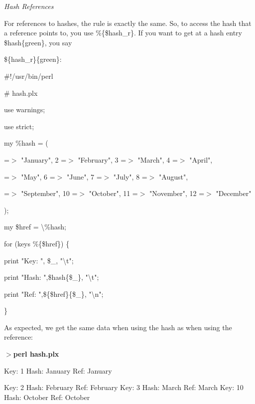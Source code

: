 \documentclass[a4paper,11pt]{book}
\begin{document}
\noindent \textit{Hash References}

\noindent For references to hashes, the rule is exactly the same. So, to access the hash that a reference points to, you use \%\{\$hash\_r\}. If you want to get at a hash entry \$hash\{green\}, you say

\noindent \$\{hash\_r\}\{green\}:

\noindent 

\noindent \#!/usr/bin/perl

\noindent \# hash.plx

\noindent use warnings;

\noindent use strict;

\noindent 

\noindent my \%hash = (

 =$>$ "January", 2 =$>$ "February", 3 =$>$ "March", 4 =$>$ "April",

 =$>$ "May", 6 =$>$ "June", 7 =$>$ "July", 8 =$>$ "August",

 =$>$ "September", 10 =$>$ "October", 11 =$>$ "November", 12 =$>$ "December"

\noindent );

\noindent 

\noindent my \$href = \textbackslash \%hash;

\noindent for (keys \%\{\$href\}) \{

\noindent print "Key: ", \$\_, "\textbackslash t";

\noindent print "Hash: ",\$hash\{\$\_\}, "\textbackslash t";

\noindent print "Ref: ",\$\{\$href\}\{\$\_\}, "\textbackslash n";

\noindent \}

\noindent 

\noindent 

\noindent As expected, we get the same data when using the hash as when using the reference:

\noindent 

\noindent $>$\textbf{perl hash.plx}

\noindent Key: 1 Hash: January Ref: January

\noindent Key: 2 Hash: February Ref: February Key: 3 Hash: March Ref: March Key: 10   Hash: October Ref: October
\end{document}
